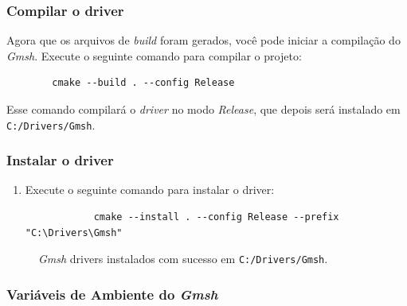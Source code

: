 \documentclass[a4paper,11pt]{article}
\newcommand{\gmsh}{\textit{Gmsh}}
\begin{document}
\subsubsection{Compilar o driver}

Agora que os arquivos de \textit{build} foram gerados, você pode iniciar a compilação do \gmsh{}. Execute o seguinte comando para compilar o projeto:
\begin{mdframed}
	\begin{verbatim}
		cmake --build . --config Release 
	\end{verbatim}
\end{mdframed}

Esse comando compilará o \textit{driver} no modo \textit{Release}, que depois será instalado em {\tt C:/Drivers/Gmsh}.

\subsubsection{Instalar o driver}

\begin{enumerate}
	\item Execute o seguinte comando para instalar o driver:
	\begin{mdframed}
		\begin{verbatim}
			cmake --install . --config Release --prefix "C:\Drivers\Gmsh"
		\end{verbatim}
	\end{mdframed}
\end{enumerate}

\begin{figure}[H]
	\centering
	\caption{\gmsh{} drivers instalados com sucesso em {\tt C:/Drivers/Gmsh}.}
	\label{fig:gmsh_install}
\end{figure}


\subsubsection{Variáveis de Ambiente do \gmsh{}}
\end{document}
